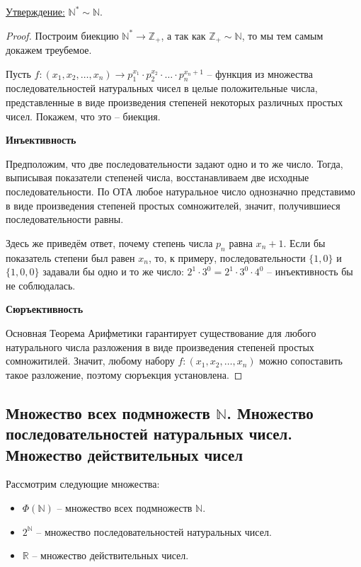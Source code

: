 \documentclass[a4paper, 12pt]{article}
\newcommand{\statement}{\underline{Утверждение:} }
\newcommand{\Z}{\mathbb{Z}}
\newcommand{\N}{\mathbb{N}}
\newcommand{\R}{\mathbb{R}}
\begin{document}
\statement $\N^* \sim \N$.
\begin{proof}

    Построим биекцию $\N^*  \to \Z_{+}$, а так как $\Z_{+} \sim \N$, то мы тем самым докажем треубемое.
    
    Пусть $f : (x_1, x_2, \ldots , x_n) \to p_{1}^{x_1} \cdot p_{2}^{x_2} \cdot \ldots \cdot p_{n}^{x_n + 1}$ -- функция из множества последовательностей натуральных чисел в целые положительные числа, представленные в виде произведения степеней некоторых различных простых чисел. Покажем, что это -- биекция.
    
    \textbf{Инъективность}
        
        Предположим, что две последовательности задают одно и то же число. Тогда, выписывая показатели степеней числа, восстанавливаем две исходные последовательности. По ОТА любое натуральное  число однозначно представимо в виде произведения степеней простых сомножителей, значит, получившиеся последовательности равны.
        
        Здесь же приведём ответ, почему степень числа $p_n$ равна $x_n + 1$. Если бы показатель степени был равен $x_n$, то, к примеру, последовательности $\{1, 0\}$ и $\{1, 0, 0\}$ задавали бы одно и то же число: $2^1 \cdot 3^0 = 2^1 \cdot 3^0 \cdot 4^0$ -- инъективность бы не соблюдалась.
        
    \textbf{Сюръективность}
    
        Основная Теорема Арифметики гарантирует существование для любого натурального числа разложения в виде произведения степеней простых сомножитилей. Значит, любому набору $f : (x_1, x_2, \ldots , x_n)$ можно сопоставить такое разложение, поэтому сюръекция установлена.
        

\end{proof}

\subsection*{Множество всех подмножеств $\N$. Множество последовательностей натуральных чисел. Множество действительных чисел}

    Рассмотрим следующие множества:

    \begin{itemize}
        \item $\Phi(\N)$ -- множество всех подмножеств $\N$.
        \item $2^{\N}$ -- множество последовательностей натуральных чисел.
        \item $\R$ -- множество действительных чисел.
    \end{itemize}
\end{document}
